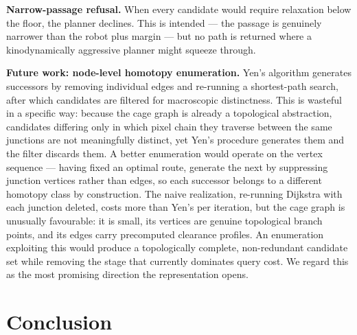 \documentclass[conference]{IEEEtran}
\begin{document}
\textbf{Narrow-passage refusal.} When every candidate would require relaxation below the floor, the planner declines. This is intended --- the passage is genuinely narrower than the robot plus margin --- but no path is returned where a kinodynamically aggressive planner might squeeze through.

\textbf{Future work: node-level homotopy enumeration.} Yen's algorithm generates successors by removing individual edges and re-running a shortest-path search, after which candidates are filtered for macroscopic distinctness. This is wasteful in a specific way: because the cage graph is already a topological abstraction, candidates differing only in which pixel chain they traverse between the same junctions are not meaningfully distinct, yet Yen's procedure generates them and the filter discards them. A better enumeration would operate on the vertex sequence --- having fixed an optimal route, generate the next by suppressing junction vertices rather than edges, so each successor belongs to a different homotopy class by construction. The naive realization, re-running Dijkstra with each junction deleted, costs more than Yen's per iteration, but the cage graph is unusually favourable: it is small, its vertices are genuine topological branch points, and its edges carry precomputed clearance profiles. An enumeration exploiting this would produce a topologically complete, non-redundant candidate set while removing the stage that currently dominates query cost. We regard this as the most promising direction the representation opens.

\section{Conclusion}
\end{document}
